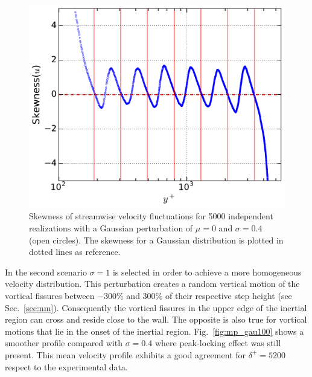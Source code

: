 \documentclass[aps,reprint,amsmath,amssymb,pra,floatfix]{revtex4-1}%
\begin{document}
\begin{figure}[tb]
\includegraphics[scale=0.46]{figures/skewness_5000_assembles}
\caption{\label{fig:skewgaus} Skewness of streamwise velocity fluctuations for 5000 independent realizations with a Gaussian perturbation of $\mu=0$ and $\sigma=0.4$ (open circles). The skewness for a Gaussian distribution is plotted in dotted lines as reference.}
\end{figure}
In the second scenario $\sigma=1$ is selected in order to achieve a more homogeneous velocity distribution. This perturbation creates a random vertical motion of the vortical fissures between $-300\%$ and $300\%$ of their respective step height (see Sec.~\ref{sec:nm}). Consequently the vortical fissures in the upper edge of the inertial region can cross and reside close to the wall. The opposite is also true for vortical motions that lie in the onset of the inertial region. Fig.~\ref{fig:mp_gau100} shows a smoother profile compared with $\sigma=0.4$ where peak-locking effect was still present. This mean velocity profile exhibits a good agreement for $\delta^+=5200$ respect to the experimental data. 
\end{document}
